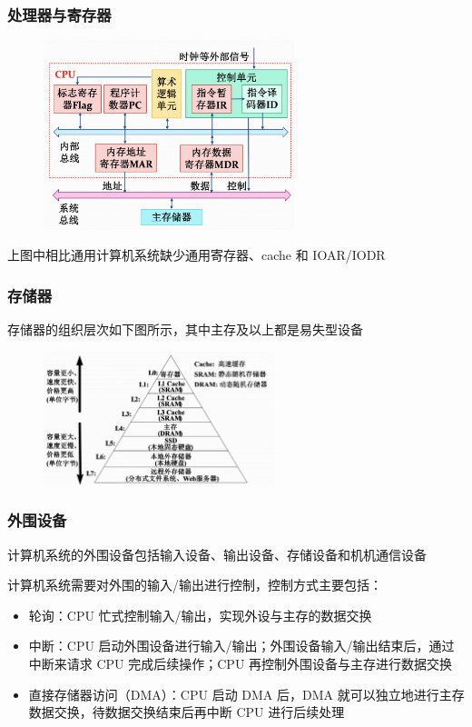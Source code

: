 \documentclass[cs4size,a4paper,10pt]{ctexart}
\begin{document}
	\subsubsection{处理器与寄存器}
	\begin{figure}[H]
		\centering
		\includegraphics[width=0.65\textwidth]{img/1.1.2.5}
	\end{figure}
	上图中相比通用计算机系统缺少通用寄存器、cache 和 IOAR/IODR

	
	\subsubsection{存储器}
	存储器的组织层次如下图所示，其中主存及以上都是易失型设备
	\begin{figure}[H]
		\centering
		\includegraphics[width=0.6\textwidth]{img/1.1.2.6}
	\end{figure}
	

	\subsubsection{外围设备}
	计算机系统的外围设备包括输入设备、输出设备、存储设备和机机通信设备

	计算机系统需要对外围的输入/输出进行控制，控制方式主要包括：
	\begin{itemize}
		\item 轮询：CPU 忙式控制输入/输出，实现外设与主存的数据交换
		\item 中断：CPU 启动外围设备进行输入/输出；外围设备输入/输出结束后，通过中断来请求 CPU 完成后续操作；CPU 再控制外围设备与主存进行数据交换
		\item 直接存储器访问（DMA）：CPU 启动 DMA 后，DMA 就可以独立地进行主存数据交换，待数据交换结束后再中断 CPU 进行后续处理
	\end{itemize}
\end{document}
